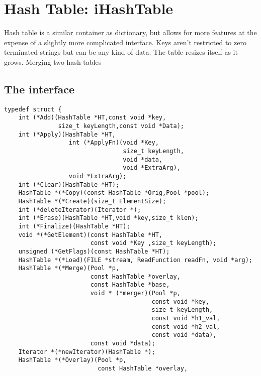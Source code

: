 \documentclass[12pt,a4paper]{memoir} %
\begin{document}
{{%
\newpage
\section{Hash Table: iHashTable}
Hash table is a similar container as dictionary, but allows for more features at the expense of a slightly more complicated interface. 
Keys aren't restricted to zero terminated strings but can be any kind of data. 
The table resizes itself as it grows.
Merging two hash tables

\subsection{The interface}
\begin{verbatim}
typedef struct {
    int (*Add)(HashTable *HT,const void *key,
               size_t keyLength,const void *Data);
    int (*Apply)(HashTable *HT,
                  int (*ApplyFn)(void *Key,
                                 size_t keyLength,
                                 void *data,
                                 void *ExtraArg),
                  void *ExtraArg);
    int (*Clear)(HashTable *HT);
    HashTable *(*Copy)(const HashTable *Orig,Pool *pool);
    HashTable *(*Create)(size_t ElementSize);
    int (*deleteIterator)(Iterator *);
    int (*Erase)(HashTable *HT,void *key,size_t klen);
    int (*Finalize)(HashTable *HT);
    void *(*GetElement)(const HashTable *HT,
                        const void *Key ,size_t keyLength);
    unsigned (*GetFlags)(const HashTable *HT);
    HashTable *(*Load)(FILE *stream, ReadFunction readFn, void *arg);
    HashTable *(*Merge)(Pool *p, 
                        const HashTable *overlay, 
                        const HashTable *base,
                        void * (*merger)(Pool *p,
                                         const void *key,
                                         size_t keyLength,
                                         const void *h1_val,
                                         const void *h2_val,
                                         const void *data),
                        const void *data);
    Iterator *(*newIterator)(HashTable *);
    HashTable *(*Overlay)(Pool *p, 
                          const HashTable *overlay, 

\end{verbatim}}}
\end{document}
